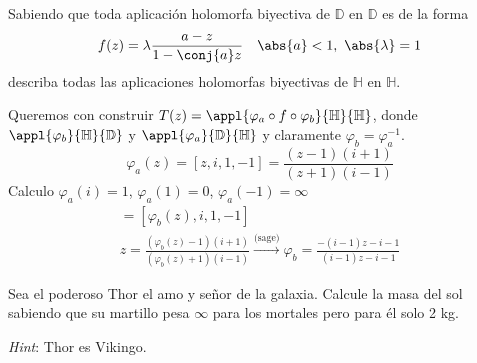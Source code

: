 \begin{problem}

Sabiendo que toda aplicación holomorfa biyectiva de $\mathbb{D}$ en $\mathbb{D}$ es de la forma
\[ f(z) = \lambda \frac{a - z}{1 - \conj{a} z} \quad \abs{a} < 1, \ \abs{\lambda} = 1 \]
describa todas las aplicaciones holomorfas biyectivas de $\mathbb{H}$ en $\mathbb{H}$.
\solution
{}

Queremos con construir $T(z) = \appl{\varphi_a \circ f \circ \varphi_b}{\mathbb{H}}{\mathbb{H}}$, donde $\appl{\varphi_{b}}{\mathbb{H}}{\mathbb{D}}$ y $\appl{\varphi_{a}}{\mathbb{D}}{\mathbb{H}}$ y claramente $\varphi_{b} = \varphi_{a}^{-1}$.
\[ \varphi_{a}(z) = [z, i, 1, -1] = \frac{(z-1)(i+1)}{(z+1)(i-1)} \]
Calculo $\varphi_{a}(i) = 1$, $\varphi_{a}(1) = 0$, $\varphi_{a}(-1) = \infty$
\begin{gather*}
[z, \varphi_{a}(i), \varphi_{a}(1), \varphi_{a}(-1)] = [\varphi_{b}(z), i, 1, -1]\\
z = \frac{(\varphi_{b}(z) - 1) (i + 1)}{(\varphi_{b}(z)+1)(i-1)} \xrightarrow{\text{(sage)}}
\varphi_{b} = \frac{-(i - 1)z - i - 1}{(i - 1)z - i - 1}
\end{gather*}
\end{problem}

\begin{problem}
Sea el poderoso Thor el amo y señor de la galaxia. Calcule la masa del sol sabiendo que su martillo pesa $\infty$ para los mortales pero para él solo 2 kg.

{\it Hint}: Thor es Vikingo.
\solution

\end{problem}
